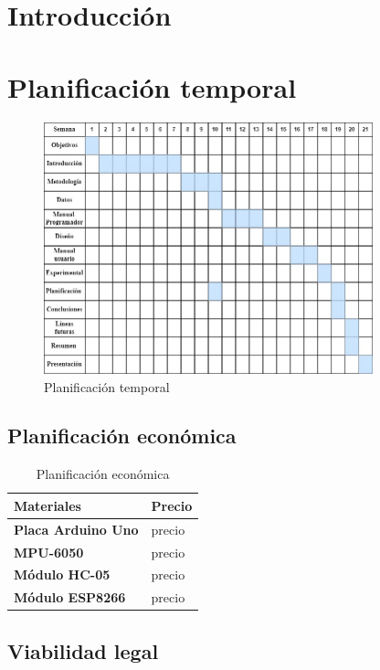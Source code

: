 
\section{Introducción}


\section{Planificación temporal}

\begin{figure}[ht]
    \centering
    \includegraphics[width=0.85\textwidth]{img/planificacionTFG.jpg}
    \caption{Planificación temporal}
    \label{fig:plan-temporal}
 \end{figure}

\subsection{Planificación económica}

\begin{table}[ht]
	\centering
	\begin{tabularx}{\linewidth}{ p{} p{} }
		\toprule
		\textbf{Materiales}    & \textbf{Precio}\\
		\toprule
		\textbf{Placa Arduino Uno}              & precio \\
		\textbf{MPU-6050}                & precio \\
        \textbf{Módulo HC-05}              & precio    \\
        \textbf{Módulo ESP8266}              & precio    \\
		\bottomrule
	\end{tabularx}
	\caption{Planificación económica}
\end{table}

\subsection{Viabilidad legal}

